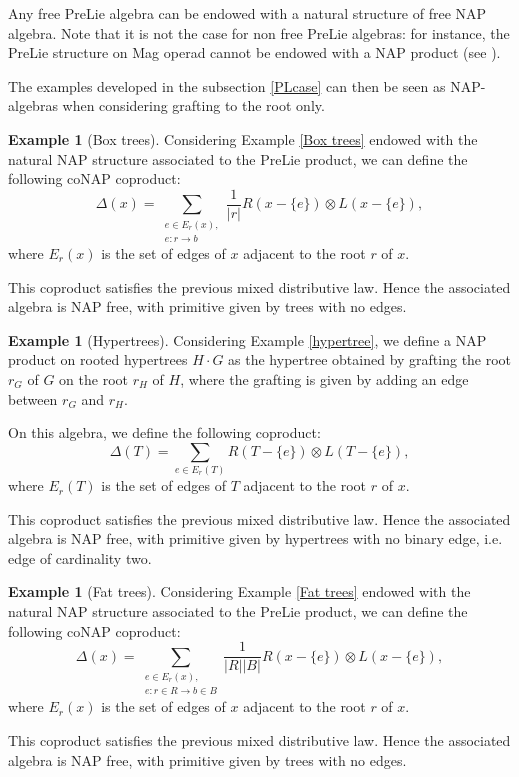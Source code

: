 \documentclass[11pt,leqno]{amsart}
\theoremstyle{definition}
\newtheorem{example}[definition]{Example}
\theoremstyle{plain}
\begin{document}
Any free PreLie algebra can be endowed with a natural structure of free NAP algebra. Note that it is not the case for non free PreLie algebras: for instance, the PreLie structure on Mag operad cannot be endowed with a NAP product (see \cite{EBBDODM}). 

The examples developed in the subsection \ref{PLcase} can then be seen as NAP-algebras when considering grafting to the root only.

\begin{example}[Box trees] 
Considering Example \ref{Box trees} endowed with the natural NAP structure associated to the PreLie product, we can define the following coNAP coproduct:
\begin{equation*}
\Delta(x)=\sum_{\substack{e \in E_r(x),\\ e: r \rightarrow b}} \frac{1}{|r|} R(x-\{e\}) \otimes L(x-\{e\}),
\end{equation*}
where $E_r(x)$ is the set of edges of $x$ adjacent to the root $r$ of $x$.

This coproduct satisfies the previous mixed distributive law. Hence the associated algebra is NAP free, with primitive given by trees with no edges.
\end{example}

\begin{example}[Hypertrees] 
Considering Example \ref{hypertree}, we define a NAP product on rooted hypertrees $H \cdot G$ as the hypertree obtained by grafting the root $r_G$ of $G$ on the root $r_H$ of $H$, where the grafting is given by adding an edge between $r_G$ and $r_H$.

On this algebra, we define the following coproduct:
\begin{equation*}
\Delta(T)=\sum_{{e \in E_r(T)}} R(T-\{e\}) \otimes L(T-\{e\}),
\end{equation*}
where $E_r(T)$ is the set of edges of $T$ adjacent to the root $r$ of $x$.


This coproduct satisfies the previous mixed distributive law. Hence the associated algebra is NAP free, with primitive given by hypertrees with no binary edge, i.e. edge of cardinality two.
\end{example}

\begin{example}[Fat trees] 
Considering Example \ref{Fat trees} endowed with the natural NAP structure associated to the PreLie product, we can define the following coNAP coproduct:
\begin{equation*}
\Delta(x)=\sum_{\substack{e \in E_r(x),\\ e: r\in R \rightarrow b \in B}} \frac{1}{|R||B|} R(x-\{e\}) \otimes L(x-\{e\}),
\end{equation*}
where $E_r(x)$ is the set of edges of $x$ adjacent to the root $r$ of $x$.

This coproduct satisfies the previous mixed distributive law. Hence the associated algebra is NAP free, with primitive given by trees with no edges.

\end{example}
\end{document}
